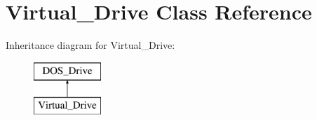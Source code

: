 \hypertarget{classVirtual__Drive}{\section{Virtual\-\_\-\-Drive Class Reference}
\label{classVirtual__Drive}
}
Inheritance diagram for Virtual\-\_\-\-Drive\-:\begin{figure}[H]
\begin{center}
\leavevmode
\includegraphics[height=2.000000cm]{classVirtual__Drive}
\end{center}
\end{figure}
